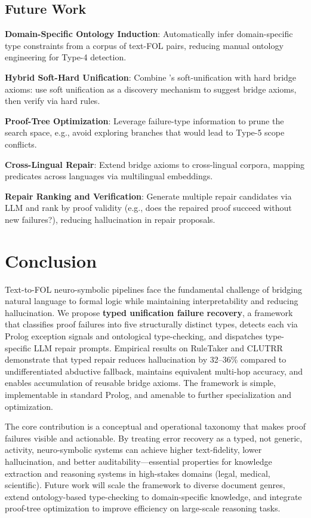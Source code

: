 \documentclass[11pt,letterpaper]{article}
\begin{document}
\subsection{Future Work}

\textbf{Domain-Specific Ontology Induction}: Automatically infer domain-specific type
constraints from a corpus of text-FOL pairs, reducing manual ontology engineering for
Type-4 detection.

\textbf{Hybrid Soft-Hard Unification}: Combine \citet{Weber2019}'s soft-unification
with hard bridge axioms: use soft unification as a discovery mechanism to suggest
bridge axioms, then verify via hard rules.

\textbf{Proof-Tree Optimization}: Leverage failure-type information to prune the
search space, e.g., avoid exploring branches that would lead to Type-5 scope
conflicts.

\textbf{Cross-Lingual Repair}: Extend bridge axioms to cross-lingual corpora, mapping
predicates across languages via multilingual embeddings.

\textbf{Repair Ranking and Verification}: Generate multiple repair candidates via LLM
and rank by proof validity (e.g., does the repaired proof succeed without new
failures?), reducing hallucination in repair proposals.

\section{Conclusion}
\label{sec:conclusion}

Text-to-FOL neuro-symbolic pipelines face the fundamental challenge of bridging
natural language to formal logic while maintaining interpretability and reducing
hallucination. We propose \textbf{typed unification failure recovery}, a framework
that classifies proof failures into five structurally distinct types, detects each via
Prolog exception signals and ontological type-checking, and dispatches type-specific
LLM repair prompts. Empirical results on RuleTaker and CLUTRR demonstrate that typed
repair reduces hallucination by 32--36\% compared to undifferentiated abductive
fallback, maintains equivalent multi-hop accuracy, and enables accumulation of
reusable bridge axioms. The framework is simple, implementable in standard Prolog, and
amenable to further specialization and optimization.

The core contribution is a conceptual and operational taxonomy that makes proof
failures visible and actionable. By treating error recovery as a typed, not generic,
activity, neuro-symbolic systems can achieve higher text-fidelity, lower hallucination,
and better auditability---essential properties for knowledge extraction and reasoning
systems in high-stakes domains (legal, medical, scientific). Future work will scale
the framework to diverse document genres, extend ontology-based type-checking to
domain-specific knowledge, and integrate proof-tree optimization to improve efficiency
on large-scale reasoning tasks.



\end{document}
